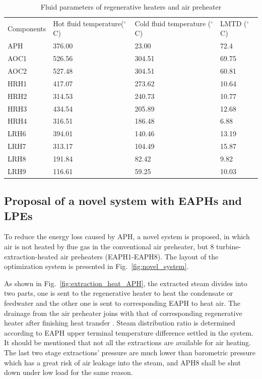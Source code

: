\documentclass[preprint,12pt]{elsarticle}
\begin{document}
\begin{table}[htbp]
\caption{Fluid parameters of regenerative heaters and air preheater}
\label{tab:reheater parameter}
\centering
\begin{tabular}{llll}
\toprule 
\multirow{2}{2cm}{Components} &\multirow{2}{2.7cm}{Hot fluid temperature($^\circ$C)}  & \multirow{2}{3.2cm}{Cold fluid temperature ($^\circ$C)}&\multirow{2}{2.2cm}{LMTD ($^\circ$C)}\tabularnewline
&&&\tabularnewline
\midrule
APH  &  376.00 	& 23.00  & 72.4\tabularnewline
AOC1 &   526.56 & 304.51 & 69.75\tabularnewline
AOC2 &  527.48 	& 304.51 & 60.81\tabularnewline
HRH1 &   417.07 & 273.62 & 10.64\tabularnewline
HRH2 &   314.53 & 240.73 & 10.77\tabularnewline
HRH3 &   434.54 & 205.89 & 12.68\tabularnewline
HRH4 &   316.51 & 186.48 & 6.88\tabularnewline
LRH6 &  394.01 	& 140.46 & 13.19\tabularnewline
LRH7 &   313.17 & 104.49 & 15.87\tabularnewline
LRH8 &   191.84 & 82.42  & 9.82\tabularnewline
LRH9 &   116.61 & 59.25  & 10.03\tabularnewline
\bottomrule
\end{tabular}
\end{table}




\subsection{Proposal of a novel system with EAPHs and LPEs}
\label{sub2:prop novel sys}

To reduce the energy loss caused by APH, a novel system is proposed, in which air is not heated by flue gas in the conventional air preheater, but 8 turbine-extraction-heated air preheaters (EAPH1-EAPH8).
The layout of the optimization system is presented in Fig.~\ref{fig:novel_system}.

As shown in Fig.~\ref{fig:extraction_heat_APH}, the extracted steam divides into two parts, one is sent to the regenerative heater to heat the condensate or feedwater and the other one is sent to corresponding EAPH to heat air.
The drainage from the air preheater joins with that of corresponding regenerative heater after finishing heat transfer .
Steam distribution ratio is determined according to EAPH upper terminal temperature difference settled in the system.
It should be mentioned that not all the extractions are available for air heating.
The last two stage extractions' pressure are much lower than barometric pressure which has a great risk of air leakage into the steam, and APH8 shall be shut down under low load for the same reason.
\end{document}
